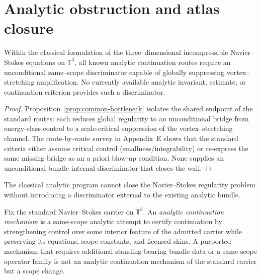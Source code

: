 \section{Analytic obstruction and atlas closure}

\begin{theorem}
\label{thm:analytic-obstruction}
Within the classical formulation of the three--dimensional incompressible Navier--Stokes equations on $\mathbb T^3$, all known analytic continuation routes require an unconditional same--scope discriminator capable of globally suppressing vortex--stretching amplification.
No currently available analytic invariant, estimate, or continuation criterion provides such a discriminator.
\end{theorem}

\begin{proof}
Proposition~\ref{prop:common-bottleneck} isolates the shared endpoint of the standard routes: each reduces global regularity to an unconditional bridge from energy-class control to a scale-critical suppression of the vortex--stretching channel.
The route-by-route survey in Appendix~E shows that the standard criteria either assume critical control (smallness/integrability) or re-express the same missing bridge as an a priori blow-up condition.
None supplies an unconditional bundle-internal discriminator that closes the wall.
\end{proof}

\begin{corollary}
\label{cor:analytic-incompleteness}
The classical analytic program cannot close the Navier--Stokes regularity problem without introducing a discriminator external to the existing analytic bundle.
\end{corollary}

\begin{definition}\label{def:analytic-mechanism}
Fix the standard Navier--Stokes carrier on $\mathbb T^3$. An \emph{analytic continuation mechanism}
is a same-scope analytic attempt to certify continuation by strengthening control over some interior
feature of the admitted carrier while preserving its equations, scope constants, and licensed skins.
A purported mechanism that requires additional standing-bearing bundle data or a same-scope
operator family is not an analytic continuation mechanism of the standard carrier but a scope change.
\end{definition}

